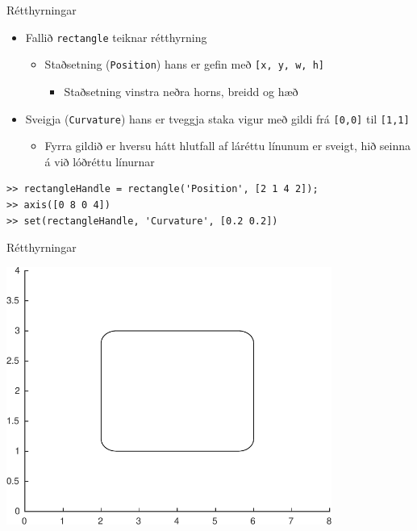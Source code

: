 \documentclass[handout]{beamer}
\begin{document}
\begin{frame}[fragile]{Rétthyrningar}
\begin{itemize}
 \item Fallið \texttt{rectangle} teiknar rétthyrning
 \begin{itemize}
  \item Staðsetning (\texttt{Position}) hans er gefin með \texttt{[x, y, w, h]}
  \begin{itemize}
   \item Staðsetning vinstra neðra horns, breidd og hæð
  \end{itemize}
 \end{itemize}
 \item Sveigja (\texttt{Curvature}) hans er tveggja staka vigur með gildi frá \texttt{[0,0]} til \texttt{[1,1]}
 \begin{itemize}
  \item Fyrra gildið er hversu hátt hlutfall af láréttu línunum er sveigt, hið seinna á við lóðréttu línurnar
 \end{itemize}
\end{itemize}
\begin{verbatim}
>> rectangleHandle = rectangle('Position', [2 1 4 2]);
>> axis([0 8 0 4])
>> set(rectangleHandle, 'Curvature', [0.2 0.2])
\end{verbatim}

\end{frame}

\begin{frame}{Rétthyrningar}
\begin{center}
\includegraphics[width=0.8\textwidth]{../Pics/rectangle-example}
\end{center}
\end{frame}
\end{document}
